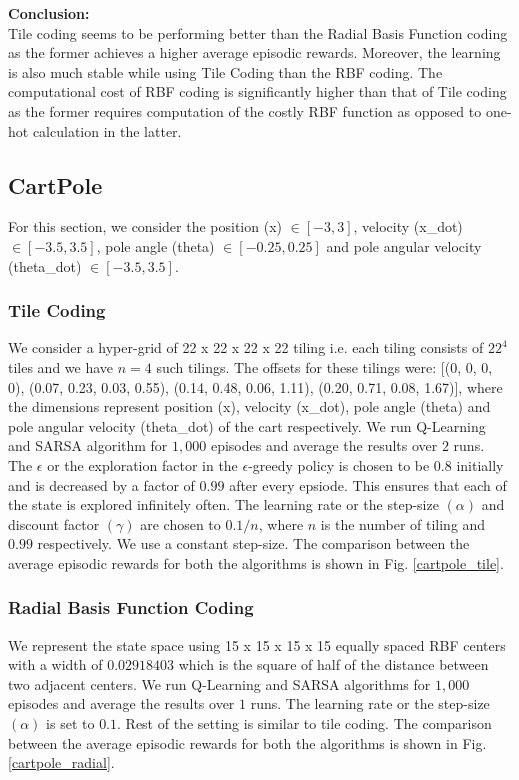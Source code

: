 \documentclass{article}
\begin{document}
        \noindent %
        \textbf{Conclusion:} \\
          Tile coding seems to be performing better than the Radial Basis Function coding 
          as the former achieves a higher average episodic rewards. Moreover, the learning is 
          also much stable while using Tile Coding than the RBF coding. The computational cost 
          of RBF coding is significantly higher than that of Tile coding as the former 
          requires computation of the costly RBF function as opposed to one-hot calculation in
          the latter.  

    \subsection{CartPole}
        For this section, we consider the position (x) $\in [-3, 3]$, velocity (x\_dot) $\in [-3.5, 3.5]$, pole angle (theta) $\in [-0.25, 0.25]$ and 
        pole angular velocity (theta\_dot) $\in [-3.5, 3.5]$.

        \subsubsection{Tile Coding}
        We consider a hyper-grid of 22 x 22 x 22 x 22 tiling i.e. each tiling consists of $22^{4}$ tiles and we have $n=4$ such tilings. The offsets for these 
        tilings were: [(0, 0, 0, 0), (0.07, 0.23, 0.03, 0.55), (0.14, 0.48, 0.06, 1.11), (0.20, 0.71, 0.08, 1.67)], where the dimensions represent position (x), 
        velocity (x\_dot), pole angle (theta) and pole angular velocity (theta\_dot) of the cart respectively. We run Q-Learning and SARSA algorithm for $1,000$ episodes and 
        average the results over $2$ runs. The $\epsilon$ or the exploration factor in the $\epsilon$-greedy policy is chosen to be $0.8$ initially and is 
        decreased by a factor of $0.99$ after every epsiode. This ensures that each of the state is explored infinitely often. The learning rate or the step-size 
        $(\alpha)$ and discount factor $(\gamma)$ are chosen to $0.1/n$, where $n$ is the number of tiling and $0.99$ respectively. We use a constant step-size.
        The comparison between the average episodic rewards for both the algorithms is shown in Fig. \ref{cartpole_tile}.

        \subsubsection{Radial Basis Function Coding}
        We represent the state space using 15 x 15 x 15 x 15 equally spaced RBF centers with a width of $0.02918403$ which is the square of half of the distance between two 
        adjacent centers. We run Q-Learning and SARSA algorithms for $1,000$ episodes and average the results over $1$ runs. The learning rate or the step-size 
        $(\alpha)$ is set to $0.1$. Rest of the setting is similar to tile coding. The comparison between the average episodic rewards for both the algorithms is shown in 
        Fig. \ref{cartpole_radial}.
\end{document}
